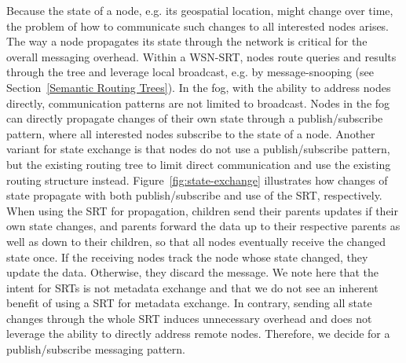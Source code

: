   Because the state of a node, e.g. its geospatial location, might change over time, the problem of how to communicate such changes to all interested nodes arises. The way a node propagates its state through the network is critical for the overall messaging overhead. Within a WSN-SRT, nodes route queries and results through the tree and leverage local broadcast, e.g. by message-snooping (see Section~\ref{Semantic Routing Trees}). In the fog, with the ability to address nodes directly, communication patterns are not limited to broadcast. Nodes in the fog can directly propagate changes of their own state through a publish/subscribe pattern, where all interested nodes subscribe to the state of a node. Another variant for state exchange is that nodes do not use a publish/subscribe pattern, but the existing routing tree to limit direct communication and use the existing routing structure instead. Figure~\ref{fig:state-exchange} illustrates how changes of state propagate with both publish/subscribe and use of the SRT, respectively. When using the SRT for propagation, children send their parents updates if their own state changes, and parents forward the data up to their respective parents as well as down to their children, so that all nodes eventually receive the changed state once. If the receiving nodes track the node whose state changed, they update the data. Otherwise, they discard the message. We note here that the intent for SRTs is not metadata exchange and that we do not see an inherent benefit of using a SRT for metadata exchange. In contrary, sending all state changes through the whole SRT induces unnecessary overhead and does not leverage the ability to directly address remote nodes. Therefore, we decide for a publish/subscribe messaging pattern.

